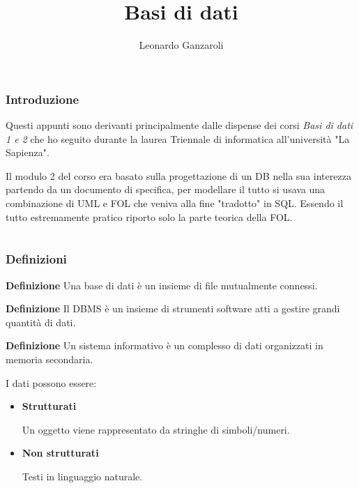 \documentclass{article}
\title{Basi di dati}
\author{Leonardo Ganzaroli}
\date{}
\begin{document}
\maketitle


\tableofcontents

\newpage

\hypersetup{allcolors=black}

\section*{Introduzione}

Questi appunti sono derivanti principalmente dalle dispense dei corsi \textit{Basi di dati 1 e 2} che ho seguito durante la laurea Triennale di informatica all'università "La Sapienza".\newline

\noindent Il modulo 2 del corso era basato sulla progettazione di un DB nella sua interezza partendo da un documento di specifica, per modellare il tutto si usava una combinazione di UML e FOL che veniva alla fine "tradotto" in SQL. Essendo il tutto estremamente pratico riporto solo la parte teorica della FOL.

\newpage

\part{}

\section{Definizioni}

\textbf{Definizione} Una base di dati è un insieme di file mutualmente connessi.\newline

\noindent\textbf{Definizione} Il DBMS è un insieme di strumenti software atti a gestire grandi quantità di dati.\newline

\noindent\textbf{Definizione} Un sistema informativo è un complesso di dati organizzati in memoria secondaria.\newline

\noindent I dati possono essere:
\begin{itemize}
    \item \textbf{Strutturati}

        Un oggetto viene rappresentato da stringhe di simboli/numeri.

    \item \textbf{Non strutturati}

        Testi in linguaggio naturale.\newline
    
    
\end{itemize}
\end{document}
